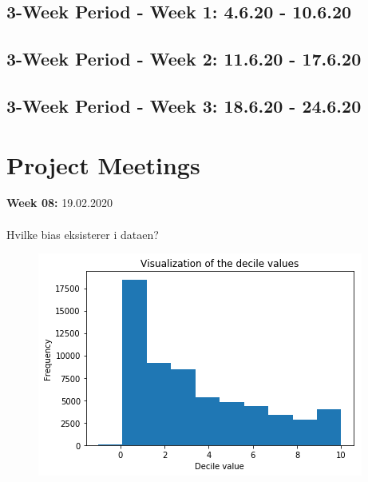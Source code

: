 \documentclass[11pt, fleqn]{article}
\begin{document}
\subsection*{3-Week Period - Week 1: 4.6.20 - 10.6.20}


\subsection*{3-Week Period - Week 2: 11.6.20 - 17.6.20}


\subsection*{3-Week Period - Week 3: 18.6.20 - 24.6.20}


		
\newpage
\newpage
\section*{Project Meetings}
	
	
	\textbf{Week 08:}  19.02.2020 \\\\
	\noindent
	Hvilke bias eksisterer i dataen? \\ 
	\begin{figure}[H]
		\centering
		\includegraphics[width=0.3\linewidth]{billeder/decil.png}
	\end{figure}
\end{document}
